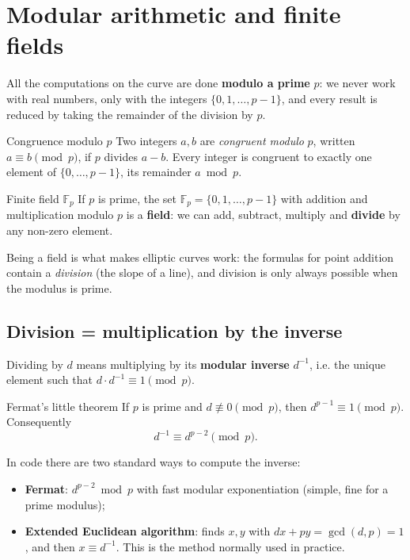 
\section{Modular arithmetic and finite fields}

All the computations on the curve are done \textbf{modulo a prime} $p$: we never work with real numbers, only with the integers $\{0, 1, \ldots, p-1\}$, and every result is reduced by taking the remainder of the division by $p$.

\begin{frameddefn}[label={def:congruence}]{Congruence modulo $p$}
  Two integers $a, b$ are \textit{congruent modulo} $p$, written $a \equiv b \pmod p$, if $p$ divides $a - b$. Every integer is congruent to exactly one element of $\{0, \ldots, p-1\}$, its remainder $a \bmod p$.
\end{frameddefn}

\begin{frameddefn}[label={def:field}]{Finite field $\mathbb{F}_p$}
  If $p$ is prime, the set $\mathbb{F}_p = \{0, 1, \ldots, p-1\}$ with addition and multiplication modulo $p$ is a \textbf{field}: we can add, subtract, multiply and \textbf{divide} by any non-zero element.
\end{frameddefn}

Being a field is what makes elliptic curves work: the formulas for point addition contain a \textit{division} (the slope of a line), and division is only always possible when the modulus is prime.

\subsection{Division = multiplication by the inverse}

Dividing by $d$ means multiplying by its \textbf{modular inverse} $d^{-1}$, i.e. the unique element such that $d \cdot d^{-1} \equiv 1 \pmod p$.

\begin{framedthm}[label={thm:fermat}]{Fermat's little theorem}
  If $p$ is prime and $d \not\equiv 0 \pmod p$, then $d^{p-1} \equiv 1 \pmod p$. Consequently
  \[
    d^{-1} \equiv d^{p-2} \pmod p .
  \]
\end{framedthm}

In code there are two standard ways to compute the inverse:
\begin{itemize}
  \item \textbf{Fermat}: $d^{p-2} \bmod p$ with fast modular exponentiation (simple, fine for a prime modulus);
  \item \textbf{Extended Euclidean algorithm}: finds $x, y$ with $d x + p y = \gcd(d,p) = 1$, and then $x \equiv d^{-1}$. This is the method normally used in practice.
\end{itemize}

